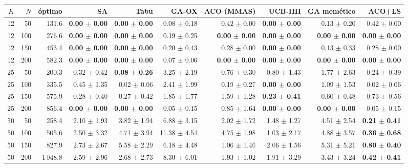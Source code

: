 \begin{tabular}{rrrrrrrrrr}
\toprule
$K$ & $N$ & óptimo & SA & Tabu & GA-OX & ACO (MMAS) & UCB-HH & GA memético & ACO+LS \\
\midrule
12 & 50 & 131.6 & \textbf{0.00 $\pm$ 0.00} & \textbf{0.00 $\pm$ 0.00} & 0.08 $\pm$ 0.18 & 0.42 $\pm$ 0.00 & \textbf{0.00 $\pm$ 0.00} & 0.13 $\pm$ 0.20 & 0.42 $\pm$ 0.00 \\
12 & 100 & 276.6 & \textbf{0.00 $\pm$ 0.00} & \textbf{0.00 $\pm$ 0.00} & 0.19 $\pm$ 0.25 & \textbf{0.00 $\pm$ 0.00} & \textbf{0.00 $\pm$ 0.00} & \textbf{0.00 $\pm$ 0.00} & \textbf{0.00 $\pm$ 0.00} \\
12 & 150 & 453.4 & \textbf{0.00 $\pm$ 0.00} & \textbf{0.00 $\pm$ 0.00} & 0.20 $\pm$ 0.43 & 0.28 $\pm$ 0.00 & \textbf{0.00 $\pm$ 0.00} & 0.13 $\pm$ 0.33 & 0.28 $\pm$ 0.00 \\
12 & 200 & 582.3 & \textbf{0.00 $\pm$ 0.00} & \textbf{0.00 $\pm$ 0.00} & 0.07 $\pm$ 0.06 & \textbf{0.00 $\pm$ 0.00} & \textbf{0.00 $\pm$ 0.00} & \textbf{0.00 $\pm$ 0.00} & \textbf{0.00 $\pm$ 0.00} \\
25 & 50 & 200.3 & 0.32 $\pm$ 0.42 & \textbf{0.08 $\pm$ 0.26} & 3.25 $\pm$ 2.19 & 0.76 $\pm$ 0.30 & 0.80 $\pm$ 1.43 & 1.77 $\pm$ 2.63 & 0.24 $\pm$ 0.39 \\
25 & 100 & 335.5 & 0.45 $\pm$ 1.35 & 0.02 $\pm$ 0.06 & 2.41 $\pm$ 1.99 & 0.19 $\pm$ 0.27 & \textbf{0.00 $\pm$ 0.00} & 1.09 $\pm$ 1.53 & 0.02 $\pm$ 0.06 \\
25 & 150 & 575.9 & 0.28 $\pm$ 0.40 & 0.27 $\pm$ 0.42 & 1.85 $\pm$ 1.77 & 1.59 $\pm$ 1.28 & \textbf{0.23 $\pm$ 0.41} & 0.60 $\pm$ 0.48 & 0.73 $\pm$ 0.56 \\
25 & 200 & 856.4 & \textbf{0.00 $\pm$ 0.00} & \textbf{0.00 $\pm$ 0.00} & 0.05 $\pm$ 0.15 & 0.85 $\pm$ 1.64 & \textbf{0.00 $\pm$ 0.00} & \textbf{0.00 $\pm$ 0.00} & 0.05 $\pm$ 0.15 \\
50 & 50 & 258.4 & 2.10 $\pm$ 1.93 & 3.82 $\pm$ 1.94 & 6.88 $\pm$ 3.15 & 2.02 $\pm$ 1.72 & 1.48 $\pm$ 1.27 & 4.51 $\pm$ 2.54 & \textbf{0.21 $\pm$ 0.41} \\
50 & 100 & 505.6 & 2.50 $\pm$ 3.32 & 4.71 $\pm$ 3.94 & 11.38 $\pm$ 4.54 & 4.75 $\pm$ 1.98 & 1.03 $\pm$ 2.17 & 4.88 $\pm$ 3.57 & \textbf{0.36 $\pm$ 0.68} \\
50 & 150 & 827.9 & 2.73 $\pm$ 2.67 & 5.58 $\pm$ 2.29 & 6.18 $\pm$ 4.48 & 1.06 $\pm$ 1.46 & 2.06 $\pm$ 1.56 & 5.31 $\pm$ 5.21 & \textbf{0.80 $\pm$ 0.40} \\
50 & 200 & 1\,048.8 & 2.59 $\pm$ 2.96 & 2.68 $\pm$ 2.73 & 8.30 $\pm$ 6.01 & 1.93 $\pm$ 1.02 & 1.91 $\pm$ 3.29 & 3.43 $\pm$ 3.24 & \textbf{0.42 $\pm$ 0.41} \\

\end{tabular}
